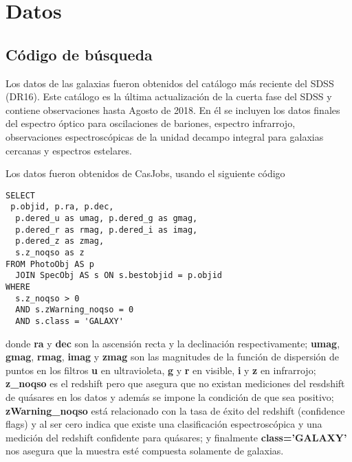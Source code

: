 \documentclass[twocolumn,letterpaper,spanish]{revtex4}
\numberwithin{equation}{section}
\begin{document}
\section{Datos}
\subsection{C\'odigo de b\'usqueda}
Los datos de las galaxias fueron obtenidos del cat\'alogo m\'as reciente del SDSS (DR16). Este cat\'alogo es la \'ultima actualizaci\'on de la cuerta fase del SDSS y contiene observaciones hasta Agosto de 2018. En \'el se incluyen los datos finales del espectro \'optico para oscilaciones de bariones, espectro infrarrojo, observaciones espectrosc\'opicas de la unidad decampo integral para galaxias cercanas y espectros estelares.%

Los datos fueron obtenidos de CasJobs, usando el siguiente c\'odigo
\begin{verbatim}
SELECT
 p.objid, p.ra, p.dec, 
  p.dered_u as umag, p.dered_g as gmag,
  p.dered_r as rmag, p.dered_i as imag, 
  p.dered_z as zmag,
  s.z_noqso as z
FROM PhotoObj AS p
  JOIN SpecObj AS s ON s.bestobjid = p.objid
WHERE 
  s.z_noqso > 0 
  AND s.zWarning_noqso = 0
  AND s.class = 'GALAXY'
\end{verbatim}
donde \textbf{ra} y \textbf{dec} son la ascensi\'on recta y la declinaci\'on respectivamente; \textbf{umag}, \textbf{gmag}, \textbf{rmag}, \textbf{imag} y \textbf{zmag} son las magnitudes de la funci\'on de dispersi\'on de puntos en los filtros \textbf{u} en ultravioleta, \textbf{g} y \textbf{r} en visible, \textbf{i} y \textbf{z} en infrarrojo; \textbf{z\_noqso} es el redshift pero que asegura que no existan mediciones del resdshift de qu\'asares en los datos y adem\'as se impone la condici\'on de que sea positivo;  \textbf{zWarning\_noqso} est\'a relacionado con la tasa de \'exito del redshift (confidence flags) y al ser cero indica que existe una clasificaci\'on espectrosc\'opica y una medici\'on del redshift confidente para qu\'asares; y finalmente \textbf{class='GALAXY'} nos asegura que la muestra est\'e compuesta solamente de galaxias.
\end{document}
